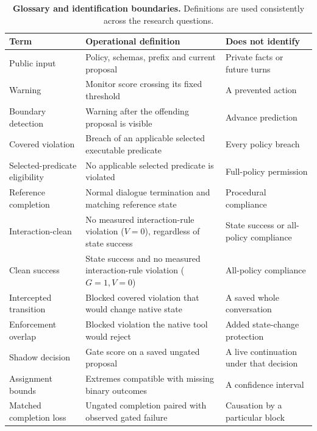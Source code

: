 \begin{table}[htbp]
\centering
\small
\caption{\textbf{Glossary and identification boundaries.} Definitions
are used consistently across the research questions.
\label{tab:glossary}}
\begin{tabular}{@{}
  >{\raggedright\arraybackslash}p{}
  >{\raggedright\arraybackslash}p{}
  >{\raggedright\arraybackslash}p{}@{}}
\toprule\noalign{}
\begin{minipage}[b]{\linewidth}\raggedright
Term
\end{minipage} & \begin{minipage}[b]{\linewidth}\raggedright
Operational definition
\end{minipage} & \begin{minipage}[b]{\linewidth}\raggedright
Does not identify
\end{minipage} \\
\midrule\noalign{}

Public input & Policy, schemas, prefix and current proposal & Private
facts or future turns \\
Warning & Monitor score crossing its fixed threshold & A prevented
action \\
Boundary detection & Warning after the offending proposal is visible &
Advance prediction \\
Covered violation & Breach of an applicable selected executable
predicate & Every policy breach \\
Selected-predicate eligibility & No applicable selected predicate is
violated & Full-policy permission \\
Reference completion & Normal dialogue termination and matching
reference state & Procedural compliance \\
Interaction-clean & No measured interaction-rule violation (\(V=0\)),
regardless of state success & State success or all-policy compliance \\
Clean success & State success and no measured interaction-rule violation
(\(G=1, V=0\)) & All-policy compliance \\
Intercepted transition & Blocked covered violation that would change
native state & A saved whole conversation \\
Enforcement overlap & Blocked violation the native tool would reject &
Added state-change protection \\
Shadow decision & Gate score on a saved ungated proposal & A live
continuation under that decision \\
Assignment bounds & Extremes compatible with missing binary outcomes & A
confidence interval \\
Matched completion loss & Ungated completion paired with observed gated
failure & Causation by a particular block \\
\bottomrule
\end{tabular}
\end{table}

